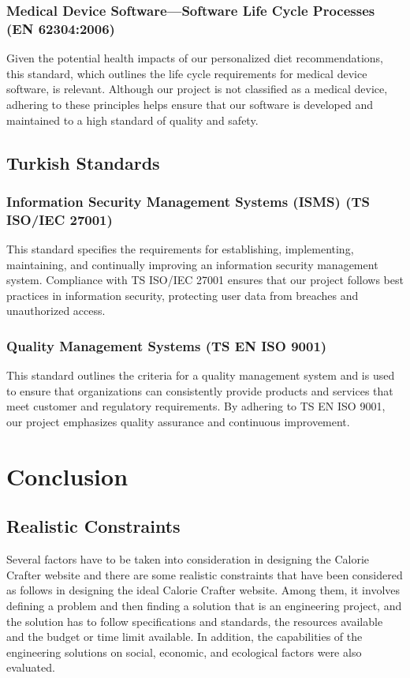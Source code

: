\documentclass[a4paper,12pt]{article}
\begin{document}
\subsubsection{Medical Device Software—Software Life Cycle Processes (EN 62304:2006)}
Given the potential health impacts of our personalized diet recommendations, this standard, which outlines the life cycle requirements for medical device software, is relevant. Although our project is not classified as a medical device, adhering to these principles helps ensure that our software is developed and maintained to a high standard of quality and safety.\cite{iso62304}


\subsection{Turkish Standards}
\subsubsection{Information Security Management Systems (ISMS) (TS ISO/IEC 27001)}
This standard specifies the requirements for establishing, implementing, maintaining, and continually improving an information security management system. Compliance with TS ISO/IEC 27001 ensures that our project follows best practices in information security, protecting user data from breaches and unauthorized access. \cite{tse27001}


\subsubsection{Quality Management Systems (TS EN ISO 9001)}
This standard outlines the criteria for a quality management system and is used to ensure that organizations can consistently provide products and services that meet customer and regulatory requirements. By adhering to TS EN ISO 9001, our project emphasizes quality assurance and continuous improvement. \cite{tse9001}


\section{Conclusion}
\subsection{Realistic Constraints}
Several factors have to be taken into consideration in designing the Calorie Crafter website and there are some realistic constraints that have been considered as follows in designing the ideal Calorie Crafter website. Among them, it involves defining a problem and then finding a solution that is an engineering project, and the solution has to follow specifications and standards, the resources available and the budget or time limit available. In addition, the capabilities of the engineering solutions on social, economic, and ecological factors were also evaluated.
\end{document}
